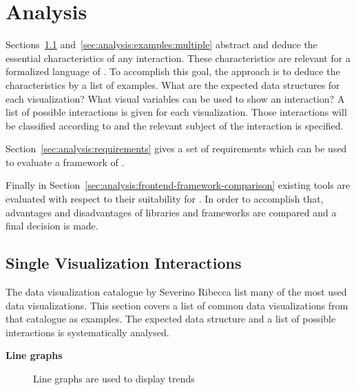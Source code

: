 \chapter{Analysis}\label{sec:analysis}
Sections~\ref{sec:analysis:examples:single} and~\ref{sec:analysis:examples:multiple} abstract and deduce the essential characteristics of any interaction.
These characteristics are relevant for a formalized language of \cmvs{}.
To accomplish this goal, the approach is to deduce the characteristics by a list of examples.
What are the expected data structures for each visualization?
What visual variables can be used to show an interaction?
A list of possible interactions is given for each visualization.
Those interactions will be classified according to \textcite{Yi2007} and the relevant subject of the interaction is specified.

Section~\ref{sec:analysis:requirements} gives a set of requirements which can be used to evaluate a framework of \cmvs{}.

Finally in Section~\ref{sec:analysis:frontend-framework-comparison} existing tools are evaluated with respect to their suitability for \cmvs{}.
In order to accomplish that, advantages and disadvantages of libraries and frameworks are compared and a final decision is made.

\section{Single Visualization Interactions}\label{sec:analysis:examples:single}

The data visualization catalogue by Severino Ribecca list many of the most used data visualizations\cite{VisualizationCatalogue2017}.
This section covers a list of common data visualizations from that catalogue as examples.
The expected data structure and a list of possible interactions is systematically analysed.

\textbf{Line graphs}
\begin{figure}
  \begin{center}
    \qquad
  \end{center}
  \caption{Line graphs are used to display trends}
  \label{fig:analysis:line-graphs}
\end{figure}

